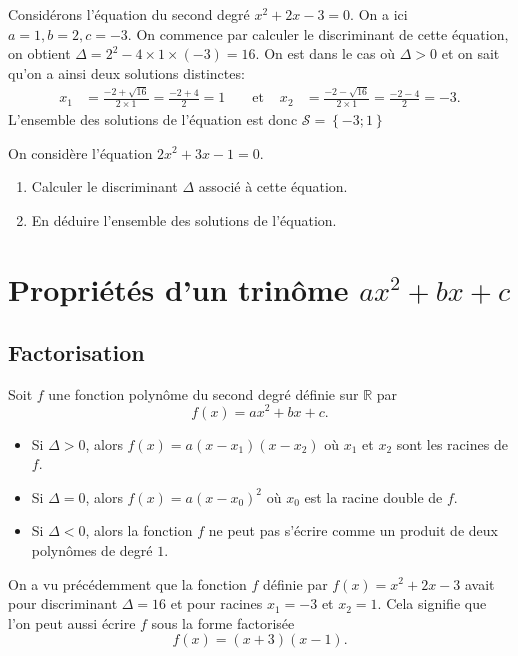 \documentclass[11pt]{article}
\begin{document}
\begin{exemple}
  Considérons l'équation du second degré $x^2+2x-3 = 0$.
  On a ici $a=1, b=2, c=-3$. On commence par calculer le discriminant de cette
  équation, on obtient $\Delta = 2^2 - 4\times 1\times(-3) = 16$.
  On est dans le cas où $\Delta>0$ et on sait qu'on a ainsi deux solutions
  distinctes:
  \begin{align*}
    x_1 &= \frac{-2+\sqrt{16}}{2\times1} = \frac{-2+4}{2} = 1 &
    &\text{ et } &
    x_2 &= \frac{-2-\sqrt{16}}{2\times1} = \frac{-2-4}{2} = -3.
  \end{align*}
 L'ensemble des solutions de l'équation est donc $\mathscr S =\left\{ -3; 1
 \right\}$
\end{exemple}

\begin{app}
  On considère l'équation $2x^2+3x-1=0$.
  \begin{enumerate}
    \item Calculer le discriminant $\Delta$ associé à cette équation.
    \item En déduire l'ensemble des solutions de l'équation.
  \end{enumerate}
\end{app}

\section{Propriétés d'un trinôme $ax^2+bx+c$}
\subsection{Factorisation}

\begin{propadm}
  Soit $f$ une fonction polynôme du second degré définie sur $\mathbb{R}$ par
  \[
    f(x) = ax^2+bx+c.
  \]
  \begin{itemize}
    \item Si $\Delta>0$, alors $f(x)=a(x-x_1)(x-x_2)$ où $x_1$ et $x_2$ sont les
      racines de $f$.
    \item Si $\Delta=0$, alors $f(x)=a(x-x_0)^2$ où $x_0$ est la racine double de
      $f$.
    \item Si $\Delta<0$, alors la fonction $f$ ne peut pas s'écrire comme un
      produit de deux polynômes de degré $1$.
  \end{itemize}
\end{propadm}

\begin{exemple}
  On a vu précédemment que la fonction $f$ définie par $f(x) = x^2+2x-3$
  avait pour discriminant $\Delta=16$ et pour racines $x_1=-3$ et $x_2=1$. Cela
  signifie que l'on peut aussi écrire $f$ sous la forme factorisée
  \[
    f(x) =(x+3)(x-1).
  \]
\end{exemple}
\end{document}
